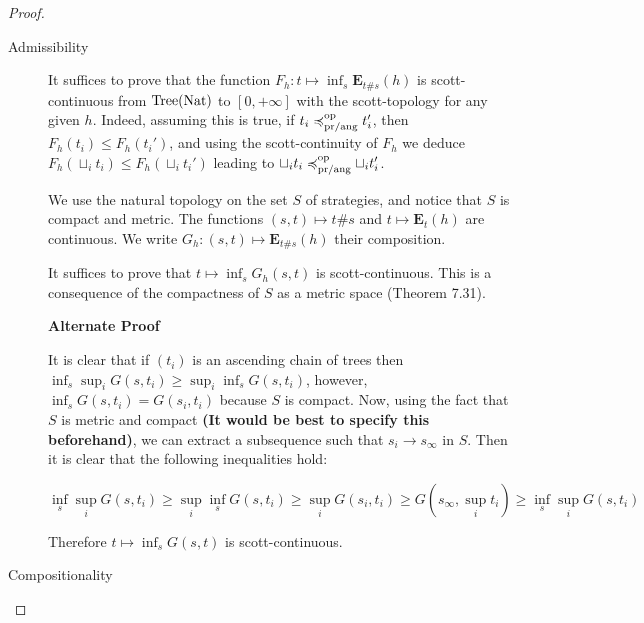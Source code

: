 \begin{proof}
    \begin{description}
        \item[Admissibility]
            It suffices to prove that the function $F_h : t \mapsto \inf_s  \mathbf{E}_{t\#s} (h)$
            is scott-continuous from $\textnormal{Tree}(\textnormal{Nat})$ to $[0,+\infty]$ with the
            scott-topology for any given $h$. Indeed, assuming this is true, 
            if $t_i \preccurlyeq^{\text{op}}_{\text{pr/ang}} t_i'$,
            then $F_h(t_i) \leq F_h (t_i')$, and using the scott-continuity
            of $F_h$ we deduce $F_h (\sqcup_i t_i) \leq F_h (\sqcup_i t_i')$
            leading to $\sqcup_i t_i \preccurlyeq^{\text{op}}_{\text{pr/ang}} \sqcup_i t_i'$.

            We use the natural topology on the set $S$ of strategies, and notice
            that $S$ is compact and metric. The functions $(s,t) \mapsto t \# s$  
            and $t \mapsto \mathbf{E}_t (h)$ are continuous.
            We write $G_h : (s,t) \mapsto \mathbf{E}_{t \# s} (h)$ their composition.

            It suffices to prove that $t \mapsto \inf_s G_h(s,t)$ is
            scott-continuous. This is a consequence of the compactness of $S$ 
            as a metric space \cite{AndreaShalk} (Theorem 7.31). 

            \textbf{Alternate Proof}

            It is clear that if $(t_i)$ is an ascending chain of trees
            then 
            $\inf_s \sup_i G(s,t_i) \geq \sup_i \inf_s G(s,t_i)$,
            however, $\inf_s G(s,t_i) = G(s_i, t_i)$ because $S$ is compact.
            Now, using the fact that $S$ is metric and compact
            \textbf{(It would be best to specify this beforehand)}, we can extract 
            a subsequence such that $s_i \rightarrow s_\infty$ in $S$. Then
            it is clear that the following inequalities hold:

            \begin{equation*}
                \inf_s \sup_i G(s,t_i)
                \geq 
                \sup_i \inf_s G(s,t_i)
                \geq 
                \sup_i G(s_i, t_i)
                \geq 
                G(s_\infty, \sup_i t_i)
                \geq
                \inf_s \sup_i G(s,t_i)
            \end{equation*}

            Therefore $t \mapsto \inf_s G(s,t)$ is scott-continuous.
        \item[Compositionality]


\end{description}
\end{proof}
